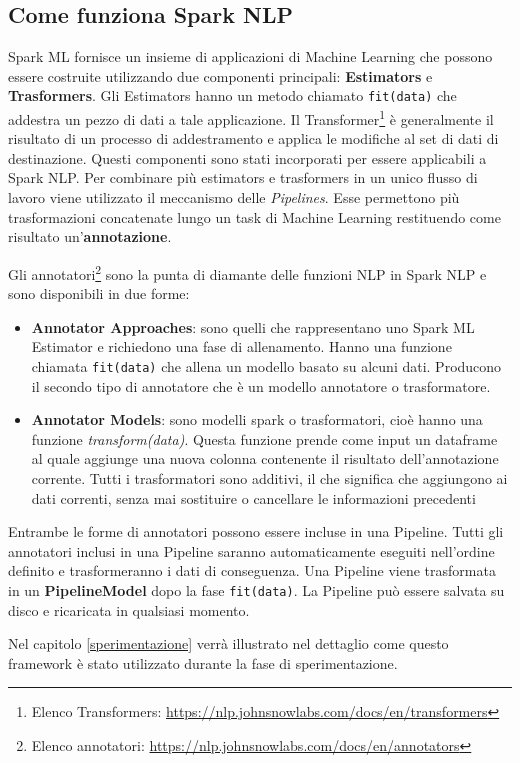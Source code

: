 \subsection{Come funziona Spark NLP}
Spark ML fornisce un insieme di applicazioni di Machine Learning che possono essere costruite
utilizzando due componenti principali: \textbf{Estimators} e \textbf{Trasformers}. Gli Estimators hanno un metodo chiamato \verb|fit(data)| che addestra un pezzo di dati a tale applicazione. Il Transformer\footnote{Elenco Transformers: \href{https://nlp.johnsnowlabs.com/docs/en/transformers}{https://nlp.johnsnowlabs.com/docs/en/transformers}} è generalmente il risultato di un processo di addestramento e applica le modifiche al set di dati di
destinazione. Questi componenti sono stati incorporati per essere applicabili a Spark NLP. Per combinare più estimators e trasformers in un unico flusso di lavoro viene utilizzato il meccanismo delle \textit{Pipelines}. Esse permettono più trasformazioni concatenate lungo un task di Machine Learning restituendo come risultato un'\textbf{annotazione}.

Gli annotatori\footnote{Elenco annotatori: \href{https://nlp.johnsnowlabs.com/docs/en/annotators}{https://nlp.johnsnowlabs.com/docs/en/annotators}} sono la punta di diamante delle funzioni NLP in Spark NLP e sono disponibili in due forme:
\begin{itemize}
    \item \textbf{Annotator Approaches}: sono quelli che rappresentano uno Spark ML Estimator e richiedono una fase di allenamento. Hanno una funzione chiamata \verb|fit(data)| che allena un modello basato su alcuni dati. Producono il secondo tipo di annotatore che è un modello annotatore o trasformatore.
    \item \textbf{Annotator Models}: sono modelli spark o trasformatori, cioè hanno una funzione \textit{transform(data)}. Questa funzione prende come input un dataframe al quale aggiunge una nuova colonna contenente il risultato dell'annotazione corrente. Tutti i trasformatori sono additivi, il che significa che aggiungono ai dati correnti, senza mai sostituire o cancellare le informazioni precedenti
\end{itemize}
Entrambe le forme di annotatori possono essere incluse in una Pipeline. Tutti gli annotatori inclusi in una Pipeline saranno automaticamente eseguiti nell'ordine definito e trasformeranno i dati di conseguenza. Una Pipeline viene trasformata in un \textbf{PipelineModel} dopo la fase \verb|fit(data)|. La Pipeline può essere salvata su disco e ricaricata in qualsiasi momento.

Nel capitolo \ref{sperimentazione} verrà illustrato nel dettaglio come questo framework è stato utilizzato durante la fase di sperimentazione.